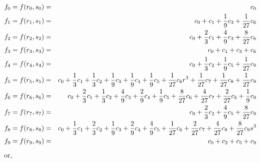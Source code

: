 \begin{eqnarray}
f_0 = f(r_0,s_0) &=& c_0 \nonumber\\
f_1 = f(r_1,s_1) &=& c_0 + c_1 + \frac19 c_3 + \frac{1}{27} c_6 \nonumber\\
f_2 = f(r_2,s_2) &=& c_0 + \frac23 c_1 + \frac{4}{9} c_3 + \frac{8}{27} c_6\nonumber\\
f_3 = f(r_3,s_3) &=& c_0 + c_1 + c_3 + c_6 \nonumber\\
f_4 = f(r_4,s_4) &=& c_0 + \frac13 c_2   + \frac19 c_5 + \frac{1}{27} c_9 \nonumber\\
f_5 = f(r_5,s_5) &=& c_0 + \frac13 c_1 + \frac13 c_2 + \frac19 c_3 
+ \frac19 c_4  + \frac19 c_5 + \frac{1}{27}c_6 r^3 + \frac{1}{27}c_7 + \frac{1}{27}c_8 + \frac{1}{27} c_9 \nonumber\\
f_6 = f(r_6,s_6) &=& c_0 + \frac23 c_1 + \frac13 c_2  
+ \frac49 c_3+ \frac29 c_4 + \frac19 c_5 + \frac{8}{27}c_6 +\frac{4}{27} c_7 +\frac{2}{27} c_8 +\frac19 c_9 \nonumber\\
f_7 = f(r_7,s_7) &=& c_0 + \frac23 c_2  + \frac49c_5 + \frac{8}{27}c_9 \nonumber\\
f_8 = f(r_8,s_8) &=& c_0 + \frac13c_1 + \frac23 c_2 + \frac19 c_3
+ \frac29 c_4  + \frac49 c_5 
+ \frac{1}{27}c_6  + \frac{2}{27}c_7  + \frac{4}{27}c_8 + \frac{8}{27}c_9 s^3 \nonumber\\
f_9 = f(r_9,s_9) &=& c_0 + c_2 + c_5 + c_9 \nonumber 
\end{eqnarray}
or,
